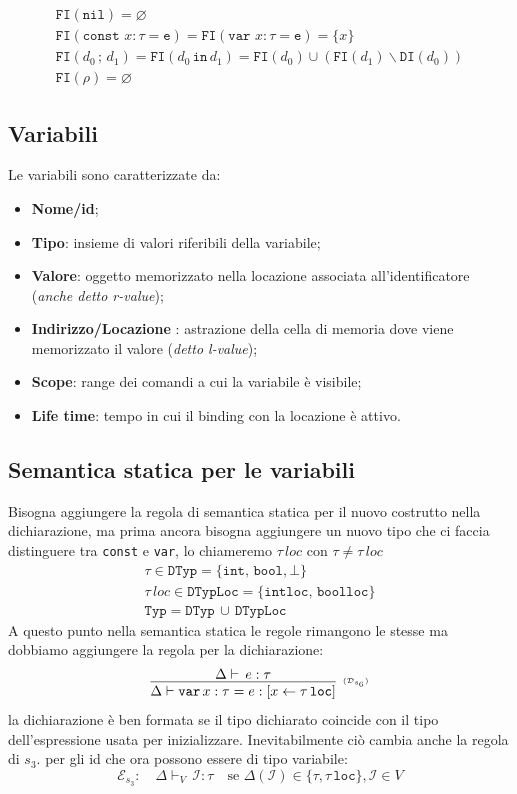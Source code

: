 \documentclass[oneside,a4paper,11pt]{book}
\theoremstyle{italicstyle}
\theoremstyle{normStyle}
\begin{document}
\begin{align*}
  \texttt{FI}(\texttt{nil}) = \varnothing \\
  \texttt{FI}(\texttt{const }x:\tau = \texttt{e}) = \texttt{FI}(\texttt{var }x:\tau = \texttt{e}) = \{x\} \\
  \texttt{FI}(d_0\,;\,d_1) = \texttt{FI}(d_0\,\texttt{in}\,d_1) = 
  \texttt{FI}(d_0)\cup (\texttt{FI}(d_1) \backslash \texttt{DI}(d_0)) \\
  \texttt{FI}(\rho) = \varnothing
\end{align*}
\subsection{Variabili}
Le variabili sono caratterizzate da:
\begin{itemize}
  \item \textbf{Nome/id};
  \item \textbf{Tipo}: insieme di valori riferibili della variabile;
  \item \textbf{Valore}: oggetto memorizzato nella locazione associata all'identificatore (\textit{anche detto r-value});
  \item \textbf{Indirizzo/Locazione} : astrazione della cella di memoria dove viene memorizzato 
  il valore (\textit{detto l-value});
  \item \textbf{Scope}: range dei comandi a cui la variabile è visibile;
  \item \textbf{Life time}: tempo in cui il binding con la locazione è attivo.
\end{itemize}
\subsection{Semantica statica per le variabili}
Bisogna aggiungere la regola di semantica statica per il nuovo costrutto nella dichiarazione, ma prima 
ancora bisogna aggiungere un nuovo tipo che ci faccia distinguere tra \verb|const| e \verb|var|, lo 
chiameremo $\tau\,loc$ con $\tau \not = \tau\,loc$
\[
\begin{matrix}
  \tau\in \texttt{DTyp} = \{\texttt{int},\,\texttt{bool},\bot\} \\
  \tau\,loc\in \texttt{DTypLoc} = \{\texttt{intloc},\,\texttt{boolloc}\} \\
  \texttt{Typ} = \texttt{DTyp} \,\cup \,\texttt{DTypLoc}
\end{matrix}  
\]
A questo punto nella semantica statica le regole rimangono le stesse ma
dobbiamo aggiungere la regola per la dichiarazione:
\[
  \infer[\scriptscriptstyle (\mathcal{D}_{s_6})]
  {
    \Delta \vdash \texttt{var}\, x:\tau= e : [x \leftarrow \tau\,\texttt{loc}]
  }
  {
    \Delta\vdash\,e:\tau
  }
\]
la dichiarazione è ben formata se il tipo dichiarato coincide con il tipo
dell’espressione usata per inizializzare. Inevitabilmente ciò cambia
anche la regola di $s_3$. per gli id che ora possono essere di tipo variabile:
\[
  \mathcal{E}_{s_3}:\quad\Delta\vdash_V \, \mathcal{I}: \tau \quad \text{se }\Delta(\mathcal{I})\in 
  \{\tau,\tau\,\texttt{loc}\},\mathcal{I}\in V
\]
\end{document}
